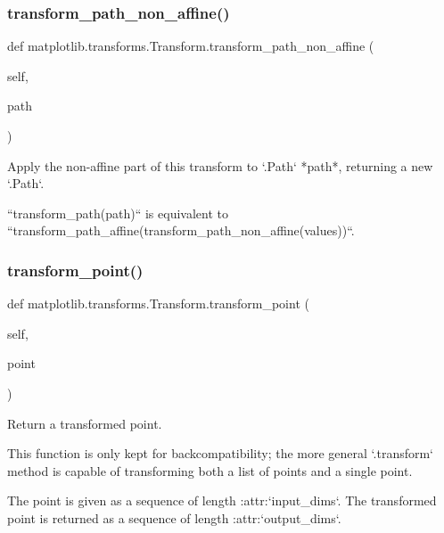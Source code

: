 \subsubsection{\texorpdfstring{transform\+\_\+path\+\_\+non\+\_\+affine()}{transform\_path\_non\_affine()}}
{\footnotesize\ttfamily def matplotlib.\+transforms.\+Transform.\+transform\+\_\+path\+\_\+non\+\_\+affine (\begin{DoxyParamCaption}\item[{}]{self,  }\item[{}]{path }\end{DoxyParamCaption})}

\begin{DoxyVerb}Apply the non-affine part of this transform to `.Path` *path*,
returning a new `.Path`.

``transform_path(path)`` is equivalent to
``transform_path_affine(transform_path_non_affine(values))``.
\end{DoxyVerb}
 \mbox{\label{classmatplotlib_1_1transforms_1_1Transform_a27944a83583b47754ef882922a00093d}} 
\subsubsection{\texorpdfstring{transform\+\_\+point()}{transform\_point()}}
{\footnotesize\ttfamily def matplotlib.\+transforms.\+Transform.\+transform\+\_\+point (\begin{DoxyParamCaption}\item[{}]{self,  }\item[{}]{point }\end{DoxyParamCaption})}

\begin{DoxyVerb}Return a transformed point.

This function is only kept for backcompatibility; the more general
`.transform` method is capable of transforming both a list of points
and a single point.

The point is given as a sequence of length :attr:`input_dims`.
The transformed point is returned as a sequence of length
:attr:`output_dims`.
\end{DoxyVerb}
 

